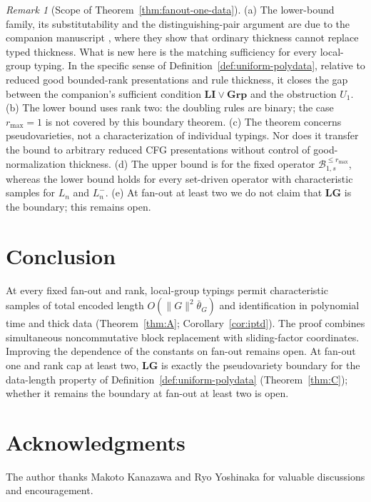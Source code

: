 \documentclass[11pt]{article}
\numberwithin{equation}{section}
\theoremstyle{plain}
\theoremstyle{definition}
\theoremstyle{remark}
\newtheorem{remark}[theorem]{Remark}
\theoremstyle{plain}
\begin{document}
\begin{remark}[Scope of Theorem~\ref{thm:fanout-one-data}]
\label{rem:fanout-one-data}
(a) The lower-bound family, its substitutability and the
distinguishing-pair argument are due to the companion manuscript
\cite[Proposition~6.4 and Appendix~C]{kuriyamaCFG}, where they show that
ordinary thickness cannot replace typed thickness.  What is new here is
the matching sufficiency for every local-group typing.  In the
specific sense of Definition~\ref{def:uniform-polydata}, relative to
reduced good bounded-rank presentations and rule thickness, it closes
the gap between the companion's sufficient condition
$\mathbf{LI}\vee\mathbf{Grp}$ and the obstruction $U_1$.
(b) The lower bound uses rank two: the doubling rules are binary;
the case $r_{\max}=1$ is not covered by this boundary theorem.
(c) The theorem concerns pseudovarieties, not a characterization of
individual typings.  Nor does it transfer the bound to arbitrary
reduced CFG presentations without control of good-normalization
thickness.
(d) The upper bound is for the fixed operator
$\mathcal B^{\le r_{\max}}_{1,s}$, whereas the lower bound holds for every
set-driven operator with characteristic samples for $L_n$ and $L_n^-$.
(e) At fan-out at least two we do not claim that $\mathbf{LG}$ is the
boundary; this remains open.
\end{remark}

\section{Conclusion}
\label{sec:conclusion}
At every fixed fan-out and rank, local-group typings permit
characteristic samples of total encoded length
$O(\|G\|^2\bar\theta_G)$ and identification in polynomial
time and thick data (Theorem~\ref{thm:A};
Corollary~\ref{cor:iptd}). The proof combines simultaneous
noncommutative block replacement with sliding-factor coordinates.
Improving the dependence of the constants on fan-out remains open.
At fan-out one and rank cap at least two, $\mathbf{LG}$ is exactly
the pseudovariety boundary for the data-length property of
Definition~\ref{def:uniform-polydata} (Theorem~\ref{thm:C});
whether it remains the boundary at fan-out at least two is open.

\section*{Acknowledgments}
The author thanks Makoto Kanazawa and Ryo Yoshinaka for valuable discussions
and encouragement.
\end{document}
